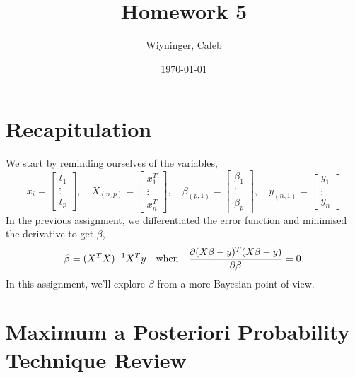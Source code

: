 \documentclass{homework}
\author{Wiyninger, Caleb}
\title{Homework 5}
\date{\today}
\begin{document}
 \maketitle

\section{Recapitulation}

We start by reminding ourselves of the variables,
\[
  x_i =
  \begin{bmatrix}%
    t_1 \\ \vdots \\ t_{p}
  \end{bmatrix},
  \quad
  X_{(n, p)} =
  \begin{bmatrix}
    x^T_1 \\ \vdots \\ x^T_n
  \end{bmatrix},
  \quad
  \beta_{(p, 1)} =
  \begin{bmatrix}
    \beta_1 \\ \vdots \\ \beta_p
  \end{bmatrix},
  \quad
  y_{(n, 1)} =
  \begin{bmatrix}
    y_1 \\ \vdots \\ y_n
  \end{bmatrix}
\]
In the previous assignment, we differentiated the error function and
minimised the derivative to get $\beta$,
\[
  \beta = (X^TX)^{-1}X^Ty
  \quad\text{when}\quad
  \frac{\partial (X\beta - y)^T(X\beta - y)}{\partial \beta} = 0.
\]
In this assignment, we'll explore $\beta$ from a more Bayesian point of view.

\section{Maximum a Posteriori Probability Technique Review}
\end{document}
